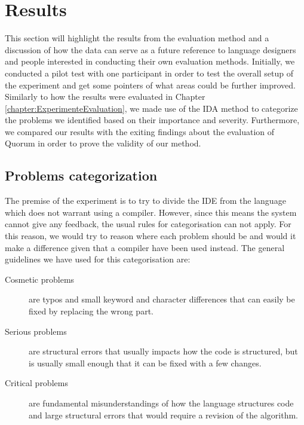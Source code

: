 \chapter{Results}
\label{chapter:Results}
This section will highlight the results from the evaluation method and a discussion of how the data can serve as a future reference to language designers and people interested in conducting their own evaluation methods. Initially, we conducted a pilot test with one participant in order to test the overall setup of the experiment and get some pointers of what areas could be further improved. Similarly to how the results were evaluated in Chapter \ref{chapter:ExperimenteEvaluation}, we made use of the IDA method \cite{IDA} to categorize the problems we identified based on their importance and severity. Furthermore, we compared our results with the exiting findings about the evaluation of Quorum in order to prove the validity of our method.



\section{Problems categorization}
\label{section: Problem Categorization}
The premise of the experiment is to try to divide the IDE from the language which does not warrant using a compiler.
However, since this means the system cannot give any feedback, the usual rules for categorisation can not apply.
For this reason, we would try to reason where each problem should be and would it make a difference given that a compiler have been used instead.
The general guidelines we have used for this categorisation are:
\begin{description}
\item[Cosmetic problems] are typos and small keyword and character differences that can easily be fixed by replacing the wrong part.
\item[Serious problems] are structural errors that usually impacts how the code is structured, but is usually small enough that it can be fixed with a few changes.
\item[Critical problems] are fundamental misunderstandings of how the language structures code and large structural errors that would require a revision of the algorithm.
\end{description}

